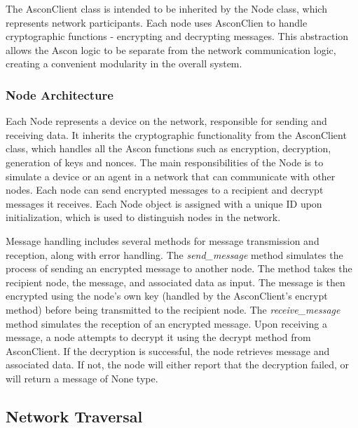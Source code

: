 \documentclass[journal]{IEEEtran}
\begin{document}
The AsconClient class is intended to be inherited by the Node class, which represents network participants. Each node uses AsconClien to handle cryptographic functions - encrypting and decrypting messages. This abstraction allows the Ascon logic to be separate from the network communication logic, creating a convenient modularity in the overall system.

\subsubsection{Node Architecture}

Each Node represents a device on the network, responsible for sending and receiving data. It inherits the cryptographic functionality from the AsconClient class, which handles all the Ascon functions such as encryption, decryption, generation of keys and nonces. The main responsibilities of the Node is to simulate a device or an agent in a network that can communicate with other nodes. Each node can send encrypted messages to a recipient and decrypt messages it receives. Each Node object is assigned with a unique ID upon initialization, which is used to distinguish nodes in the network. 

Message handling includes several methods for message transmission and reception, along with error handling. The \textit{send\_message} method simulates the process of sending an encrypted message to another node. The method takes the recipient node, the message, and associated data as input. The message is then encrypted using the node's own key (handled by the AsconClient's encrypt method) before being transmitted to the recipient node. The \textit{receive\_message} method simulates the reception of an encrypted message. Upon receiving a message, a node attempts to decrypt it using the decrypt method from AsconClient. If the decryption is successful, the node retrieves message and associated data. If not, the node will either report that the decryption failed, or will return a message of None type. 




\subsection{Network Traversal}
\end{document}
